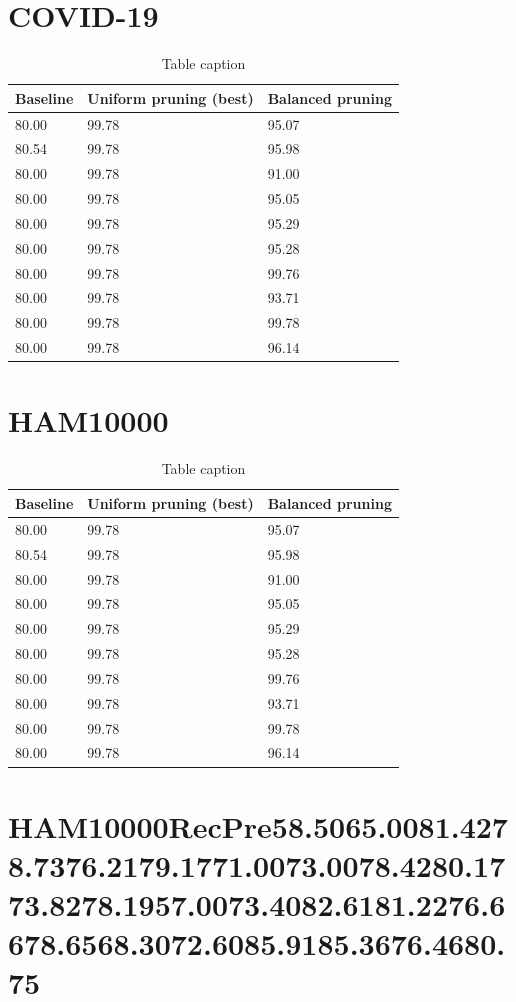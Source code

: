 \documentclass[final,5p,times,twocolumn,authoryear]{elsarticle}
\begin{document}
\section{COVID-19}
\begin{table}[htbp]
\centering
\caption{Table caption}
\begin{tabular}{lll}
\hline
Baseline & Uniform pruning (best) & Balanced pruning \\
\hline
80.00 & 99.78 & 95.07 \\
80.54 & 99.78 & 95.98 \\
80.00 & 99.78 & 91.00 \\
80.00 & 99.78 & 95.05 \\
80.00 & 99.78 & 95.29 \\
80.00 & 99.78 & 95.28 \\
80.00 & 99.78 & 99.76 \\
80.00 & 99.78 & 93.71 \\
80.00 & 99.78 & 99.78 \\
80.00 & 99.78 & 96.14 \\
\hline
\end{tabular}
\end{table}
\section{HAM10000}
\begin{table}[htbp]
\centering
\caption{Table caption}
\begin{tabular}{lll}
\hline
Baseline & Uniform pruning (best) & Balanced pruning \\
\hline
80.00 & 99.78 & 95.07 \\
80.54 & 99.78 & 95.98 \\
80.00 & 99.78 & 91.00 \\
80.00 & 99.78 & 95.05 \\
80.00 & 99.78 & 95.29 \\
80.00 & 99.78 & 95.28 \\
80.00 & 99.78 & 99.76 \\
80.00 & 99.78 & 93.71 \\
80.00 & 99.78 & 99.78 \\
80.00 & 99.78 & 96.14 \\
\hline
\end{tabular}
\end{table}

\section{HAM10000RecPre58.5065.0081.4278.7376.2179.1771.0073.0078.4280.1773.8278.1957.0073.4082.6181.2276.6678.6568.3072.6085.9185.3676.4680.75}
\end{document}
